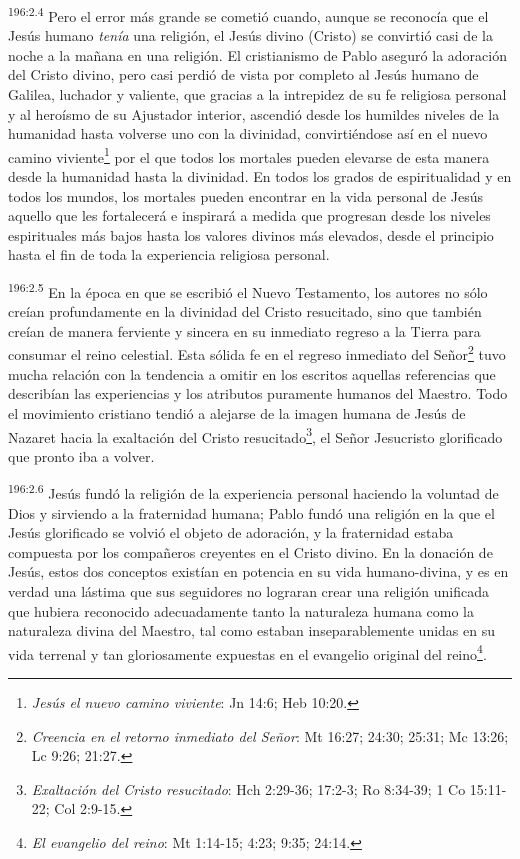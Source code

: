 \par 
\textsuperscript{196:2.4} Pero el error más grande se cometió cuando, aunque se reconocía que el Jesús humano \textit{tenía} una religión, el Jesús divino (Cristo) se convirtió casi de la noche a la mañana en una religión. El cristianismo de Pablo aseguró la adoración del Cristo divino, pero casi perdió de vista por completo al Jesús humano de Galilea, luchador y valiente, que gracias a la intrepidez de su fe religiosa personal y al heroísmo de su Ajustador interior, ascendió desde los humildes niveles de la humanidad hasta volverse uno con la divinidad, convirtiéndose así en el nuevo camino viviente\footnote{\textit{Jesús el nuevo camino viviente}: Jn 14:6; Heb 10:20.} por el que todos los mortales pueden elevarse de esta manera desde la humanidad hasta la divinidad. En todos los grados de espiritualidad y en todos los mundos, los mortales pueden encontrar en la vida personal de Jesús aquello que les fortalecerá e inspirará a medida que progresan desde los niveles espirituales más bajos hasta los valores divinos más elevados, desde el principio hasta el fin de toda la experiencia religiosa personal.

\par 
\textsuperscript{196:2.5} En la época en que se escribió el Nuevo Testamento, los autores no sólo creían profundamente en la divinidad del Cristo resucitado, sino que también creían de manera ferviente y sincera en su inmediato regreso a la Tierra para consumar el reino celestial. Esta sólida fe en el regreso inmediato del Señor\footnote{\textit{Creencia en el retorno inmediato del Señor}: Mt 16:27; 24:30; 25:31; Mc 13:26; Lc 9:26; 21:27.} tuvo mucha relación con la tendencia a omitir en los escritos aquellas referencias que describían las experiencias y los atributos puramente humanos del Maestro. Todo el movimiento cristiano tendió a alejarse de la imagen humana de Jesús de Nazaret hacia la exaltación del Cristo resucitado\footnote{\textit{Exaltación del Cristo resucitado}: Hch 2:29-36; 17:2-3; Ro 8:34-39; 1 Co 15:11-22; Col 2:9-15.}, el Señor Jesucristo glorificado que pronto iba a volver.

\par 
\textsuperscript{196:2.6} Jesús fundó la religión de la experiencia personal haciendo la voluntad de Dios y sirviendo a la fraternidad humana; Pablo fundó una religión en la que el Jesús glorificado se volvió el objeto de adoración, y la fraternidad estaba compuesta por los compañeros creyentes en el Cristo divino. En la donación de Jesús, estos dos conceptos existían en potencia en su vida humano-divina, y es en verdad una lástima que sus seguidores no lograran crear una religión unificada que hubiera reconocido adecuadamente tanto la naturaleza humana como la naturaleza divina del Maestro, tal como estaban inseparablemente unidas en su vida terrenal y tan gloriosamente expuestas en el evangelio original del reino\footnote{\textit{El evangelio del reino}: Mt 1:14-15; 4:23; 9:35; 24:14.}.


